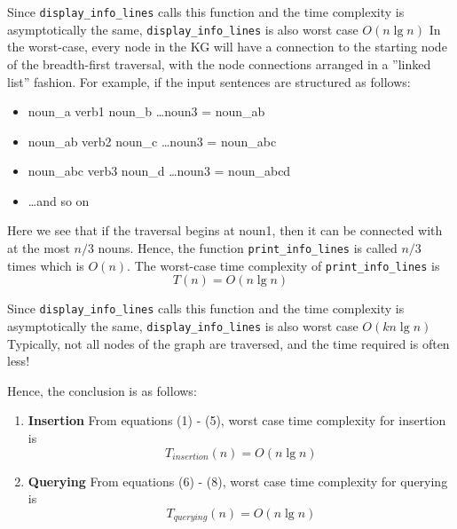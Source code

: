 \documentclass[conference]{IEEEtran}
\begin{document}
\begin{enumerate}
\begin{itemize}
Since \texttt{display\_info\_lines} calls this function
and the time complexity is asymptotically the same,
\texttt{display\_info\_lines} is also worst case $O(n \lg n)$
In the worst-case, every node in the KG will have a
connection to the starting node of the breadth-first traversal,
with the node connections arranged in a ”linked list” fashion.
For example, if the input sentences are structured as follows:
\begin{itemize}
    \item noun\_a   verb1 noun\_b   \ldots noun3 = noun\_ab
    \item noun\_ab  verb2 noun\_c   \ldots noun3 = noun\_abc
    \item noun\_abc verb3 noun\_d   \ldots noun3 = noun\_abcd
    \item \ldots and so on
\end{itemize}
Here we see that if the traversal begins at noun1, then it can
be connected with at the most $n/3$ nouns. Hence, the function
\texttt{print\_info\_lines} is called $n/3$ times which is $O(n)$.
The worst-case time complexity of \texttt{print\_info\_lines} is
\begin{equation}
    T(n) = O(n\lg n)
\end{equation}
\end{itemize}
\end{enumerate}
Since \texttt{display\_info\_lines} calls this function and the time complexity is asymptotically the same, \texttt{display\_info\_lines} is also worst case $O(kn \lg n)$
Typically, not all nodes of the graph are traversed, and the
time required is often less!

Hence, the conclusion is as follows:
\begin{enumerate}
    \item \textbf{Insertion} From equations (1) - (5), worst case time complexity for insertion is 
    \begin{equation*}
        T_{insertion}(n) = O(n\lg n) 
    \end{equation*}

    \item \textbf{Querying} From equations (6) - (8), worst case time complexity for querying is 
    \begin{equation*}
        T_{querying}(n) = O(n\lg n) 
    \end{equation*}
\end{enumerate}
\end{document}
